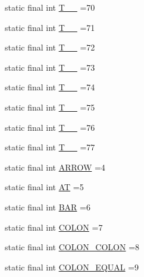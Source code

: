 \begin{DoxyCompactItemize}
\item 
static final int \hyperlink{classorg_1_1tzi_1_1use_1_1parser_1_1ocl_1_1_o_c_l_lexer_ac7aed124dbe939d5bd2e514e0299716f}{T\-\_\-\-\_} =70
\item 
static final int \hyperlink{classorg_1_1tzi_1_1use_1_1parser_1_1ocl_1_1_o_c_l_lexer_abb437907b1e1082f10ccd3aa2427f770}{T\-\_\-\-\_} =71
\item 
static final int \hyperlink{classorg_1_1tzi_1_1use_1_1parser_1_1ocl_1_1_o_c_l_lexer_a79f094bfcd5ff2d2487522492c548295}{T\-\_\-\-\_} =72
\item 
static final int \hyperlink{classorg_1_1tzi_1_1use_1_1parser_1_1ocl_1_1_o_c_l_lexer_a2d20a74d05eff4a38af27082bb1231be}{T\-\_\-\-\_} =73
\item 
static final int \hyperlink{classorg_1_1tzi_1_1use_1_1parser_1_1ocl_1_1_o_c_l_lexer_a616ddfa7822fb0f4a673943bd8e09ed7}{T\-\_\-\-\_} =74
\item 
static final int \hyperlink{classorg_1_1tzi_1_1use_1_1parser_1_1ocl_1_1_o_c_l_lexer_a0254d802a419f5eef2f044eb2fae3b0b}{T\-\_\-\-\_} =75
\item 
static final int \hyperlink{classorg_1_1tzi_1_1use_1_1parser_1_1ocl_1_1_o_c_l_lexer_a32f491f85dccf43ce70fdbc5e07bd74a}{T\-\_\-\-\_} =76
\item 
static final int \hyperlink{classorg_1_1tzi_1_1use_1_1parser_1_1ocl_1_1_o_c_l_lexer_a20092f703c0030f4605b9ff076a857d8}{T\-\_\-\-\_} =77
\item 
static final int \hyperlink{classorg_1_1tzi_1_1use_1_1parser_1_1ocl_1_1_o_c_l_lexer_aae7d496ebe400ad739303c3908a4b410}{A\-R\-R\-O\-W} =4
\item 
static final int \hyperlink{classorg_1_1tzi_1_1use_1_1parser_1_1ocl_1_1_o_c_l_lexer_aad997e71225ea6e592fa504e31825480}{A\-T} =5
\item 
static final int \hyperlink{classorg_1_1tzi_1_1use_1_1parser_1_1ocl_1_1_o_c_l_lexer_a39ab2a85441ca80ab630d3456d1d137e}{B\-A\-R} =6
\item 
static final int \hyperlink{classorg_1_1tzi_1_1use_1_1parser_1_1ocl_1_1_o_c_l_lexer_a59c7db2ee17ba88b01f1b6ac4852c836}{C\-O\-L\-O\-N} =7
\item 
static final int \hyperlink{classorg_1_1tzi_1_1use_1_1parser_1_1ocl_1_1_o_c_l_lexer_a90ef9f1565fdebf7b1a70e805b921fcc}{C\-O\-L\-O\-N\-\_\-\-C\-O\-L\-O\-N} =8
\item 
static final int \hyperlink{classorg_1_1tzi_1_1use_1_1parser_1_1ocl_1_1_o_c_l_lexer_a5e5285cb2d500a3314ae4d5309dbc5c4}{C\-O\-L\-O\-N\-\_\-\-E\-Q\-U\-A\-L} =9

\end{DoxyCompactItemize}
